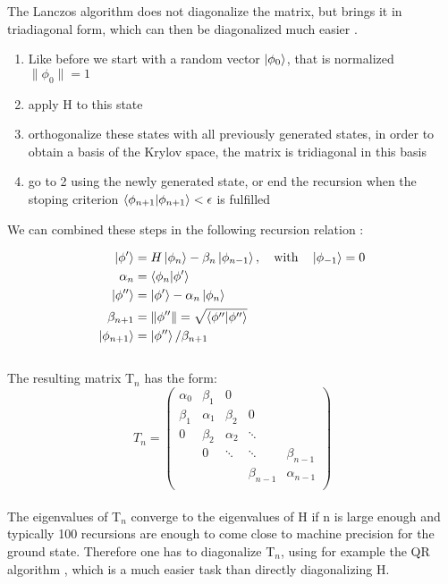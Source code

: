 \documentclass[a4paper,12pt]{article}
\begin{document}
The Lanczos algorithm does not diagonalize the matrix, but brings it
in  triadiagonal form, which can then be diagonalized much easier \cite{Fehske}.
\begin{enumerate}
\item\label{item:1} Like before we start with a random vector
  $\ket{\phi_0}$, that is normalized\\
 $\|\phi_0\| = 1$
\item\label{item:2} apply H to this state
\item\label{item:3} orthogonalize these states with all previously
  generated states, in order to
  obtain a basis of the Krylov space, the matrix is tridiagonal in this basis
\item\label{item:4} go to 2 using the newly generated state, or end the
  recursion when the stoping criterion $\braket{\phi_{n+1}|\phi_{n+1}}
  < \epsilon$ is fulfilled 

\end{enumerate}
We can combined these steps in the following recursion relation \cite{Fehske}:

\begin{align*}
\ket{\phi'}&=H\ket{\phi_n} - \beta_n\ket{\phi_{n-1}}, \quad \text{with} \quad \ket{\phi_{-1}} = 0\\
\alpha_n &= \braket{\phi_n|\phi'}\\
\ket{\phi''} &= \ket{\phi'} - \alpha_n\ket{\phi_n}\\
\beta_{n+1} &= \|\phi''\| = \sqrt{\braket{\phi''|\phi''}}\\
\ket{\phi_{n+1}} &= \ket{\phi''}/\beta_{n+1}
\end{align*}\\
The resulting matrix T$_n$ has the form:\\
\begin{equation*}
T_n = 
\begin{pmatrix}
\alpha_0 & \beta_1 & 0 & &\\
\beta_1 & \alpha_1 & \beta_2 & 0 &\\
0 & \beta_2 & \alpha_2 & \ddots & \\
 & 0 & \ddots & \ddots & \beta_{n-1}\\
 & & & \beta_{n-1} & \alpha_{n-1}\\
\end{pmatrix}
\end{equation*}\\
The eigenvalues of T$_n$ converge to the eigenvalues of H if n is
large enough and typically 100 recursions are enough to come close to
machine precision for the ground state. Therefore one has to
diagonalize T$_n$, using for example the QR algorithm \cite{Francis1,Francis2}, which is a much
easier task than directly diagonalizing H.
\end{document}

